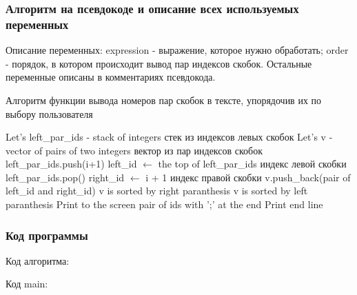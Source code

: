 \documentclass[a4paper, 14pt]{extarticle}
\begin{document}
\subsubsection{Алгоритм на псевдокоде и описание всех используемых переменных}
Описание переменных: expression - выражение, которое нужно обработать;
order - порядок, в котором происходит вывод пар индексов скобок.
Остальные переменные описаны в комментариях псевдокода.
\begin{algorithm}
  \caption{Алгоритм функции вывода номеров пар скобок в тексте,
  упорядочив их по выбору пользователя}
  \label{alg:paranthesis_alg}
  \begin{algorithmic}
    \State Let's left\_par\_ids - stack of integers \Comment стек из индексов левых скобок
    \State Let's v - vector of pairs of two integers \Comment вектор из пар индексов скобок
    \State left\_par\_ids.push(i+1)
    \State left\_id $\gets$ the top of left\_par\_ids \Comment индекс левой скобки
    \State left\_par\_ids.pop()
    \State right\_id $\gets$ i + 1 \Comment индекс правой скобки
    \State v.push\_back(pair of left\_id and right\_id)
    \EndIf
    \EndFor
    \State v is sorted by right paranthesis
    \Else \State v is sorted by left paranthesis
    \EndIf
    \State Print to the screen pair of ids with ';' at the end
    \EndFor
    \State Print end line
    \EndProcedure
  \end{algorithmic}
\end{algorithm}

\subsubsection{Код программы}
Код алгоритма:

Код main:

\end{document}

